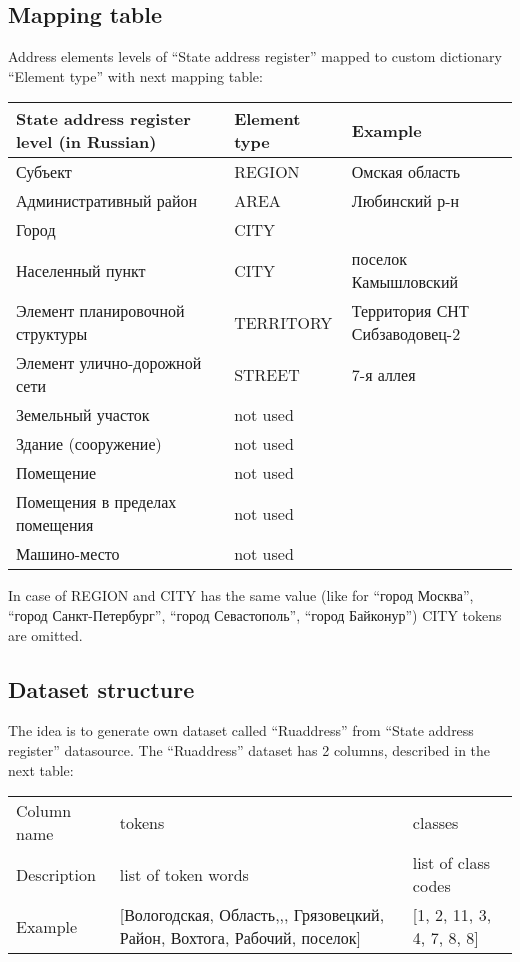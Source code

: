 \documentclass{article}
\begin{document}
\subsection{Mapping table}
Address elements levels of ``State address register'' mapped to custom dictionary ``Element type'' with next mapping table:


\begin{center}
    \begin{tabular}{| l | l | l | }
        \hline
        State address register level (in Russian) & Element type & Example  \\
        \hline
        Субъект & REGION & Омская область  \\
        Административный район & AREA & Любинский р-н   \\
        Город & CITY &    \\
        Населенный пункт & CITY &  поселок Камышловский \\
        Элемент планировочной структуры & TERRITORY & Территория СНТ Сибзаводовец-2  \\
        Элемент улично-дорожной сети & STREET & 7-я аллея \\
        Земельный участок & not used & \\
        Здание (сооружение) & not used &  \\
        Помещение & not used & \\
        Помещения в пределах помещения & not used  &\\
        Машино-место & not used  &\\
        \hline
    \end{tabular}
\end{center}

In case of REGION and CITY has the same value (like for ``город Москва'', ``город Санкт-Петербург'', ``город Севастополь'', ``город Байконур'') CITY tokens are omitted.

\subsection{Dataset structure}

The idea is to generate own dataset called ``Ruaddress'' from ``State address register'' datasource.
The ``Ruaddress'' dataset has 2 columns, described in the next table:

\begin{center}
    \begin{tabular}{| l | p{6cm} | l | }
        \hline
        Column name & tokens & classes  \\
        Description & list of token words & list of class codes  \\
        Example & [Вологодская, Область,,, Грязовецкий, Район, Вохтога, Рабочий, поселок] &  [1, 2, 11, 3, 4, 7, 8, 8] \\
        \hline
    \end{tabular}
\end{center}
\end{document}
